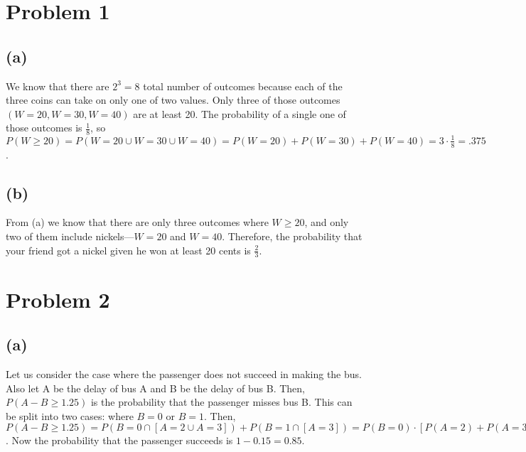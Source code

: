 \documentclass{article}
\begin{document}
\thispagestyle{fancy}

\list{} \item \endlist

\section*{Problem 1} 

\subsection*{(a)}

We know that there are $2^{3} = 8$ total number of outcomes because each of the
three coins can take on only one of two values. Only three of those outcomes
$(W = 20, W = 30, W = 40)$ are at least 20. The probability of a single
one of those outcomes is $\frac{1}{8}$, so $P(W \geq 20)=P( W = 20 \cup W=30
\cup W=40 )=P( W = 20 ) + P( W = 30 ) + P( W = 40 ) = 3 \cdot \frac{1}{8} =
.375$.

\subsection*{(b)}

From (a) we know that there are only three outcomes where $W \geq 20$, and only
two of them include nickels---$W = 20$ and $W = 40$. Therefore, the probability
that your friend got a nickel given he won at least 20 cents is $\frac{2}{3}$.

\section*{Problem 2}

\subsection*{(a)}

Let us consider the case where the passenger does not succeed in making the
bus. Also let A be the delay of bus A and B be the delay of bus B. Then, $P(A -
B \geq 1.25)$ is the probability that the passenger misses bus B. This can be
split into two cases: where $B = 0$ or $B = 1$. Then, $P( A - B \geq 1.25 ) =
P( B = 0 \cap [A = 2 \cup A = 3] ) + P( B = 1 \cap [A = 3]) = P(B=0)\cdot [P(A
= 2 ) + P( A = 3 ) ] + P(B=1)\cdot P(A = 3 ) = 0.5\cdot (0.15 + 0.1) + 0.25\cdot
0.1 = 0.15$. Now the probability that the passenger succeeds is $1 - 0.15 =
0.85$.
\end{document}
